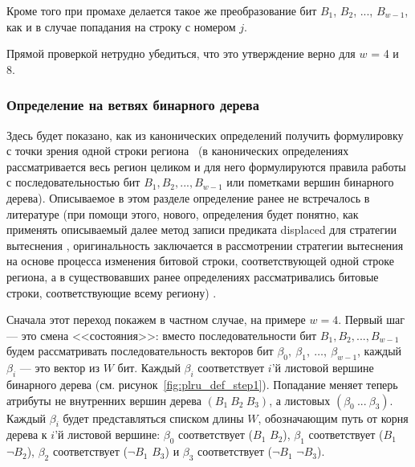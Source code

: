 \begin{utv}
Кроме того при промахе делается такое же преобразование бит $B_1$, $B_2$, ..., $B_{w{-}1}$, как и в случае попадания на строку с номером $j$.
\end{utv}

Прямой проверкой нетрудно убедиться, что это утверждение верно для $w$ = 4 и 8.

\subsubsection{Определение \PseudoLRU на ветвях бинарного дерева}\label{sec:PseudoLRUonBranches}

Здесь будет показано, как из канонических определений \PseudoLRU получить формулировку \PseudoLRU с точки зрения одной строки региона~\cite{my_lomonosov_2010} (в канонических определениях рассматривается весь регион целиком и для него формулируются правила работы с последовательностью бит $B_1, B_2, ..., B_{w{-}1}$ или пометками вершин бинарного дерева). Описываемое в этом разделе определение \PseudoLRU ранее не встречалось в литературе (при помощи этого, нового, определения будет понятно, как применять описываемый далее метод записи предиката displaced для стратегии вытеснения \PseudoLRU, оригинальность заключается в рассмотрении стратегии вытеснения \PseudoLRU на основе процесса изменения битовой строки, соответствующей одной строке региона, а в существовавших ранее определениях рассматривались битовые строки, соответствующие всему региону) .

Сначала этот переход покажем в частном случае, на примере $w=4$. Первый шаг --- это
смена <<состояния>>: вместо последовательности бит $B_1, B_2, ...,
B_{w-1}$ будем рассматривать последовательность векторов бит
$\beta_0,~\beta_1,~\dots,~\beta_{w-1}$, каждый $\beta_i$ --- это вектор из $W$ бит. Каждый $\beta_i$ соответствует $i$'й листовой вершине бинарного дерева (см. рисунок~\ref{fig:plru_def_step1}). Попадание
меняет теперь атрибуты не внутренних вершин дерева $(B_1~B_2~B_3)$, а листовых $(\beta_0~...~\beta_3)$.
Каждый $\beta_i$ будет представляться списком длины $W$, обозначающим путь от
корня дерева к $i$'й листовой вершине: $\beta_0$ соответствует
($B_1$ $B_2$), $\beta_1$ соответствует ($B_1$ $\neg B_2$), $\beta_2$
соответствует ($\neg B_1$ $B_3$) и $\beta_3$ соответствует ($\neg
B_1$ $ \neg B_3$).\\[0.5cm]

